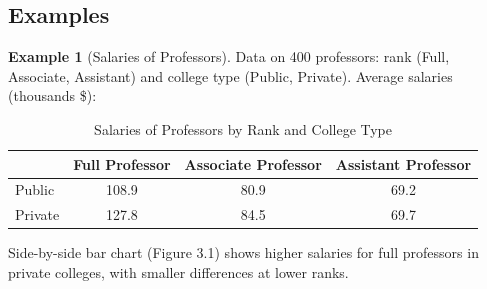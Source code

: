 \documentclass{article}
\theoremstyle{definition}
\newtheorem{example}{Example}
\begin{document}
	\subsection{Examples}
	\begin{example}[Salaries of Professors]
		Data on 400 professors: rank (Full, Associate, Assistant) and college type (Public, Private). Average salaries (thousands \$):
	\end{example}	
		\begin{table}[ht]
			\centering
			\begin{tabular}{lccc}
				\toprule
				& Full Professor & Associate Professor & Assistant Professor \\
				\midrule
				Public & 108.9 & 80.9 & 69.2 \\
				Private & 127.8 & 84.5 & 69.7 \\
				\bottomrule
			\end{tabular}
			\caption{Salaries of Professors by Rank and College Type}
		\end{table}
		Side-by-side bar chart (Figure 3.1) shows higher salaries for full professors in private colleges, with smaller differences at lower ranks.
\end{document}

